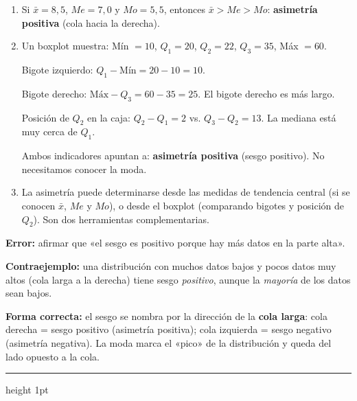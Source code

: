 \documentclass[11pt, letterpaper]{article}
\newcommand{\subbloque}[1]{%
  \vspace{14pt}
  \noindent{\large\bfseries\color{zenitnavy} #1}\par
  \vspace{4pt}\hrule height 1pt\vspace{8pt}}
\begin{document}
\begin{tcolorbox}[examplebox, title={Ej. 14. Identificar asimetría desde distintas fuentes}]
\begin{enumerate}[label=\textbf{\arabic*.}, leftmargin=2.8cm]
  \item[\textbf{Desde medidas:}] Si $\bar{x} = 8{,}5$, $Me = 7{,}0$ y $Mo = 5{,}5$, entonces $\bar{x} > Me > Mo$: \textbf{asimetría positiva} (cola hacia la derecha).

  \medskip
  \item[\textbf{Desde un boxplot:}] Un boxplot muestra: Mín $= 10$, $Q_1 = 20$, $Q_2 = 22$, $Q_3 = 35$, Máx $= 60$.

  Bigote izquierdo: $Q_1 - \text{Mín} = 20 - 10 = 10$.

  Bigote derecho: $\text{Máx} - Q_3 = 60 - 35 = 25$. El bigote derecho es más largo.

  Posición de $Q_2$ en la caja: $Q_2 - Q_1 = 2$ vs. $Q_3 - Q_2 = 13$. La mediana está muy cerca de $Q_1$.

  Ambos indicadores apuntan a: \textbf{asimetría positiva} (sesgo positivo). No necesitamos conocer la moda.

  \medskip
  \item[\textbf{Conclusión.}] La asimetría puede determinarse desde las medidas de tendencia central (si se conocen $\bar{x}$, $Me$ y $Mo$), o desde el boxplot (comparando bigotes y posición de $Q_2$). Son dos herramientas complementarias.
\end{enumerate}
\end{tcolorbox}

\begin{tcolorbox}[warningbox, title={Error frecuente: confundir la dirección del sesgo con la concentración de datos}]
\textbf{Error:} afirmar que «el sesgo es positivo porque hay más datos en la parte alta».

\medskip
\textbf{Contraejemplo:} una distribución con muchos datos bajos y pocos datos muy altos (cola larga a la derecha) tiene sesgo \textit{positivo}, aunque la \textit{mayoría} de los datos sean bajos.

\medskip
\textbf{Forma correcta:} el sesgo se nombra por la dirección de la \textbf{cola larga}: cola derecha = sesgo positivo (asimetría positiva); cola izquierda = sesgo negativo (asimetría negativa). La moda marca el «pico» de la distribución y queda del lado opuesto a la cola.
\end{tcolorbox}

\subbloque{Práctica inmediata 7.1}
\end{document}
